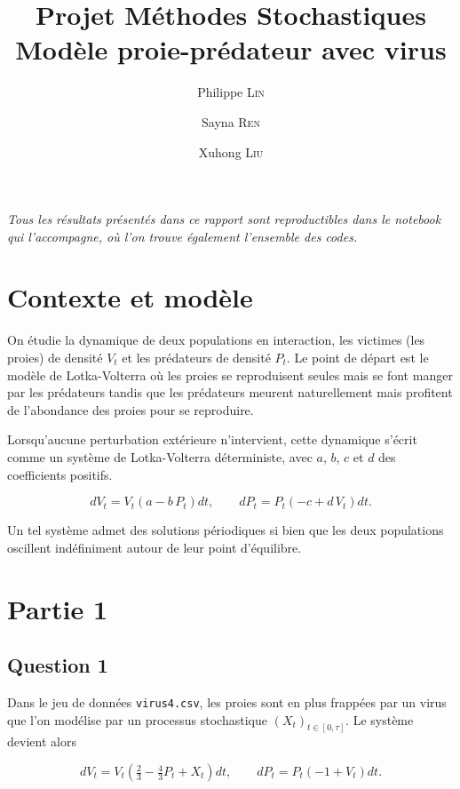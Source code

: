 \documentclass[11pt,a4paper]{article}
\title{Projet Méthodes Stochastiques\\[0.3em]
       \large Modèle proie-prédateur avec virus}
\author{Philippe \textsc{Lin} \and Sayna \textsc{Ren} \and Xuhong \textsc{Liu}}
\date{}
\begin{document}
\maketitle

\textit{Tous les résultats présentés dans ce rapport sont reproductibles dans le notebook qui l'accompagne, où l'on trouve également l'ensemble des codes.}

\section*{Contexte et modèle}

On étudie la dynamique de deux populations en interaction, les victimes (les proies) de densité $V_t$ et les prédateurs de densité $P_t$. Le point de départ est le modèle de Lotka-Volterra où les proies se reproduisent seules mais se font manger par les prédateurs tandis que les prédateurs meurent naturellement mais profitent de l'abondance des proies pour se reproduire.

Lorsqu'aucune perturbation extérieure n'intervient, cette dynamique s'écrit comme un système de Lotka-Volterra déterministe, avec $a$, $b$, $c$ et $d$ des coefficients positifs.

\begin{equation}\label{eq:base}
  dV_t = V_t\left(a - b\,P_t\right)dt,
  \qquad
  dP_t = P_t\left(-c + d\,V_t\right)dt.
\end{equation}

Un tel système admet des solutions périodiques si bien que les deux populations oscillent indéfiniment autour de leur point d'équilibre.

\section*{Partie 1}

\subsection*{Question 1}

Dans le jeu de données \texttt{virus4.csv}, les proies sont en plus frappées par un virus que l'on modélise par un processus stochastique $(X_t)_{t\in[0,\tau]}$. Le système devient alors

\begin{equation}\label{eq:systeme}
  dV_t = V_t\left(\tfrac{2}{3} - \tfrac{4}{3}P_t + X_t\right)dt,
  \qquad
  dP_t = P_t\left(-1 + V_t\right)dt.
\end{equation}
\end{document}
